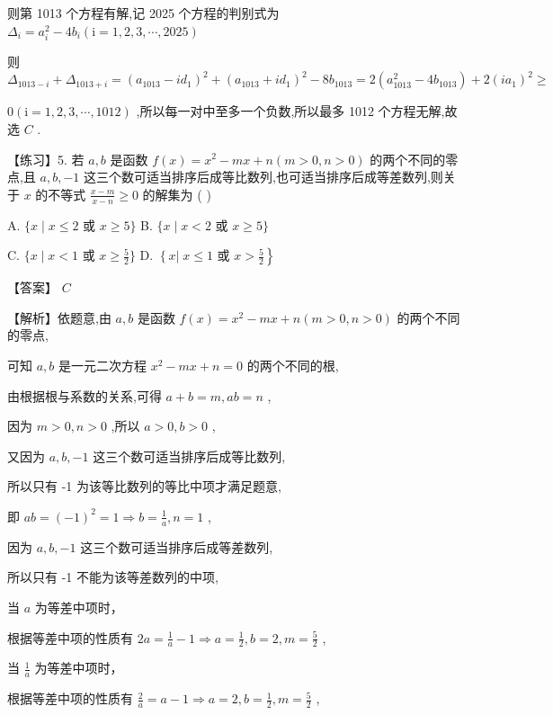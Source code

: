 \documentclass[10pt]{article}
\newcommand*\circled[1]{\tikz[baseline=(char.base)]{\node[shape=circle,draw,inner sep=1.5pt] (char) {\small #1};}}
\begin{document}
则第 1013 个方程有解,记 2025 个方程的判别式为 \({\Delta }_{i} = {a}_{i}^{2} - 4{b}_{i}\left( {\mathrm{i} = 1,2,3,\cdots ,{2025}}\right)\)

则 \({\Delta }_{{1013} - i} + {\Delta }_{{1013} + i} = {\left( {a}_{1013} - i{d}_{1}\right) }^{2} + {\left( {a}_{1013} + i{d}_{1}\right) }^{2} - 8{b}_{1013} = 2\left( {{a}_{1013}^{2} - 4{b}_{1013}}\right)  + 2{\left( i{a}_{1}\right) }^{2} \geq\)

\(0\left( {\mathrm{i} = 1,2,3,\cdots ,{1012}}\right)\) ,所以每一对中至多一个负数,所以最多 1012 个方程无解,故选 \(C\) .

【练习】5. 若 \(a,b\) 是函数 \(f\left( x\right)  = {x}^{2} - {mx} + n\left( {m > 0,n > 0}\right)\) 的两个不同的零点,且 \(a,b, - 1\) 这三个数可适当排序后成等比数列,也可适当排序后成等差数列,则关于 \(x\) 的不等式 \(\frac{x - m}{x - n} \geq  0\) 的解集为 ( )

A. \(\{ x \mid  x \leq  2\) 或 \(x \geq  5\}\) B. \(\{ x \mid  x < 2\) 或 \(x \geq  5\}\)

C. \(\{ x \mid  x < 1\) 或 \(x \geq  \frac{5}{2}\}\) D. \(\left\{  {x\left| {\;x \leq  1}\right. }\right.\) 或 \(\left. {x > \frac{5}{2}}\right\}\)

【答案】 \(C\)

【解析】依题意,由 \(a,b\) 是函数 \(f\left( x\right)  = {x}^{2} - {mx} + n\left( {m > 0,n > 0}\right)\) 的两个不同的零点,

可知 \(a,b\) 是一元二次方程 \({x}^{2} - {mx} + n = 0\) 的两个不同的根,

由根据根与系数的关系,可得 \(a + b = m,{ab} = n\) ,

因为 \(m > 0,n > 0\) ,所以 \(a > 0,b > 0\) ,

又因为 \(a,b, - 1\) 这三个数可适当排序后成等比数列,

所以只有 -1 为该等比数列的等比中项才满足题意,

即 \({ab} = {\left( -1\right) }^{2} = 1 \Rightarrow  b = \frac{1}{a},n = 1\) ,

因为 \(a,b, - 1\) 这三个数可适当排序后成等差数列,

所以只有 -1 不能为该等差数列的中项,

 \circled{1} 当 \(a\) 为等差中项时，

根据等差中项的性质有 \({2a} = \frac{1}{a} - 1 \Rightarrow  a = \frac{1}{2},b = 2,m = \frac{5}{2}\) ,

 \circled{2}  当 \(\frac{1}{a}\) 为等差中项时，

根据等差中项的性质有 \(\frac{2}{a} = a - 1 \Rightarrow  a = 2,b = \frac{1}{2},m = \frac{5}{2}\) ,
\end{document}
